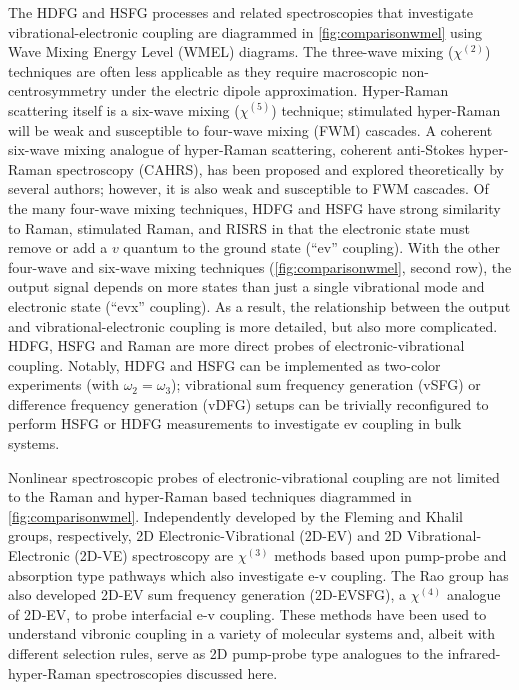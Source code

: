 \documentclass[aip, jcp, reprint, onecolumn, nofootinbib]{revtex4-2}
\begin{document}
The HDFG and HSFG processes and related spectroscopies that investigate vibrational-electronic coupling are diagrammed in \autoref{fig:comparisonwmel} using Wave Mixing Energy Level (WMEL) diagrams. \cite{RN286}
The three-wave mixing ($\chi^{(2)}$) techniques are often less applicable as they require macroscopic non-centrosymmetry under the electric dipole approximation.\cite{RN480}
Hyper-Raman scattering itself is a six-wave mixing ($\chi^{(5)}$) technique; stimulated hyper-Raman will be weak and susceptible to four-wave mixing (FWM) cascades.\cite{RN515, RN243, Cho2000_Cascade}
A coherent six-wave mixing analogue of hyper-Raman scattering, coherent anti-Stokes hyper-Raman spectroscopy (CAHRS), has been proposed and explored theoretically by several authors; however, it is also weak and susceptible to FWM cascades.\cite{Taran1977, Berger1978, Bjarnason1980, Cho1997, Cho1998}
Of the many four-wave mixing techniques, HDFG and HSFG have strong similarity to Raman, stimulated Raman, and RISRS in that the electronic state must remove or add a $v$ quantum to the ground state (``ev'' coupling).
With the other four-wave and six-wave mixing techniques (\autoref{fig:comparisonwmel}, second row), the output signal depends on more states than just a single vibrational mode and electronic state (``evx'' coupling).\cite{RN445, RN335} 
As a result, the relationship between the output and vibrational-electronic coupling is more detailed, but also more complicated.
HDFG, HSFG and Raman are more direct probes of electronic-vibrational coupling.
Notably, HDFG and HSFG can be implemented as two-color experiments (with $\omega_2=\omega_3$);\cite{Cho2001} vibrational sum frequency generation (vSFG) or difference frequency generation (vDFG) setups can be trivially reconfigured to perform HSFG or HDFG measurements to investigate ev coupling in bulk systems.

Nonlinear spectroscopic probes of electronic-vibrational coupling are not limited to the Raman and hyper-Raman based techniques diagrammed in \autoref{fig:comparisonwmel}.
Independently developed by the Fleming and Khalil groups, respectively, 2D Electronic-Vibrational (2D-EV) and 2D Vibrational-Electronic (2D-VE) spectroscopy are $\chi^{(3)}$ methods based upon pump-probe and absorption type pathways which also investigate e-v coupling.\cite{Oliver2014, Courtney2015, Courtney2015_1}
The Rao group has also developed 2D-EV sum frequency generation (2D-EVSFG), a $\chi^{(4)}$ analogue of 2D-EV, to probe interfacial e-v coupling. \cite{Deng2021}  
These methods have been used to understand vibronic coupling in a variety of molecular systems and, albeit with different selection rules, serve as 2D pump-probe type analogues to the infrared-hyper-Raman spectroscopies discussed here.
\end{document}
